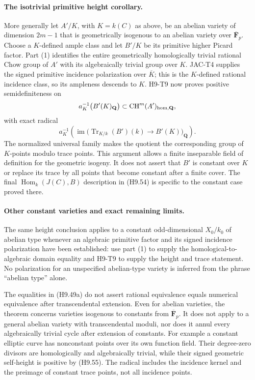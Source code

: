 \documentclass[11pt,a4paper]{article}
\begin{document}
\paragraph{The isotrivial primitive height corollary.}
More generally let $A'/K$, with $K=k(C)$ as above, be an abelian
variety of dimension $2m-1$ that is geometrically isogenous to an
abelian variety over $\overline{\mathbf F}_p$. Choose a $K$-defined
ample class and let $B'/K$ be its primitive higher Picard factor.
Part (1) identifies the entire geometrically homologically trivial
rational Chow group of $A'$ with its algebraically trivial group
over $K$. JAC-T4 supplies the signed primitive incidence
polarization over $\overline K$; this is the $K$-defined rational
incidence class, so its ampleness descends to $K$. H9-T9 now proves
positive semidefiniteness on
\[
 a_K^{-1}\bigl(B'(K)_{\mathbf Q}\bigr)
 \subset\operatorname{CH}^m(A')_{\rm hom,\mathbf Q},
\]
with exact radical
\[
 a_K^{-1}\!\left(
    \operatorname{im}\bigl(\operatorname{Tr}_{K/k}(B')(k)
                  \longrightarrow B'(K)\bigr)_{\mathbf Q}
             \right).
\]
The normalized universal family makes the quotient the corresponding
group of $K$-points modulo trace points. This argument allows a
finite inseparable field of definition for the geometric isogeny.
It does not assert that $B'$ is constant over $K$ or replace its
trace by all points that become constant after a finite cover.
The final $\operatorname{Hom}_k(J(C),B)$ description in (H9.54)
is specific to the constant case proved there.

\paragraph{Other constant varieties and exact remaining limits.}
The same height conclusion applies to a constant odd-dimensional
$X_0/k_0$ of abelian type whenever an algebraic primitive factor and
its signed incidence polarization have been established: use part (1)
to supply the homological-to-algebraic domain equality and H9-T9 to
supply the height and trace statement. No polarization for an
unspecified abelian-type variety is inferred from the phrase
``abelian type'' alone.

The equalities in (H9.49a) do not assert rational equivalence equals
numerical equivalence after transcendental extension. Even for
abelian varieties, the theorem concerns varieties isogenous
to constants from $\overline{\mathbf F}_p$. It does not apply to a
general abelian variety with transcendental moduli, nor does it
annul every algebraically trivial cycle after extension of constants.
For example a constant elliptic curve has nonconstant points over
its own function field. Their degree-zero divisors are homologically
and algebraically trivial, while their signed geometric self-height
is positive by (H9.55). The radical includes the incidence kernel
and the preimage of constant trace points, not all incidence points.
\end{document}
